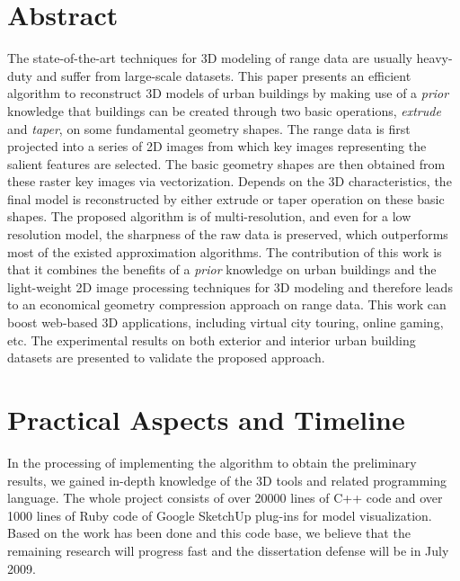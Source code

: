 \documentclass[12pt,letterpaper]{article}
\newcommand{\twocol}{0}
\renewcommand{\twocol}{true}
\begin{document}
\section{Abstract}
The state-of-the-art techniques for 3D modeling of range data are usually heavy-duty and
suffer from large-scale datasets.
This paper presents an efficient algorithm to reconstruct 3D models of urban buildings by
making use of a \emph{prior} knowledge that buildings can be created through two basic
operations, \emph{extrude} and \emph{taper}, on some fundamental geometry shapes.
The range data is first projected into a series of 2D images from which
key images representing the salient features are selected.
The basic geometry shapes are then obtained from these raster key images via vectorization.
Depends on the 3D characteristics, the final model is reconstructed by either
extrude or taper operation on these basic shapes.
The proposed algorithm is of multi-resolution, and even for a low resolution model,
the sharpness of the raw data is preserved, which
outperforms most of the existed approximation algorithms.
The contribution of this work is that it combines the benefits of a \emph{prior} knowledge on
urban buildings and the light-weight 2D image processing techniques for 3D modeling and therefore
leads to an economical geometry compression approach on range data.
This work can boost web-based 3D applications, including virtual city touring, online gaming, etc.
The experimental results on both exterior and interior urban building datasets are presented to
validate the proposed approach.

\ifthenelse{\equal{\twocol}{true}}{
}{
\newpage %
}
\section{Practical Aspects and Timeline}

In the processing of implementing the algorithm to obtain the preliminary results, we gained in-depth
knowledge of the 3D tools and related programming language. The whole project consists of over 20000
lines of C++ code and over 1000 lines of Ruby code of Google SketchUp plug-ins for model visualization.
Based on the work has been done and this code base, we believe that the remaining research will
progress fast and the dissertation defense will be in July 2009.
\end{document}

